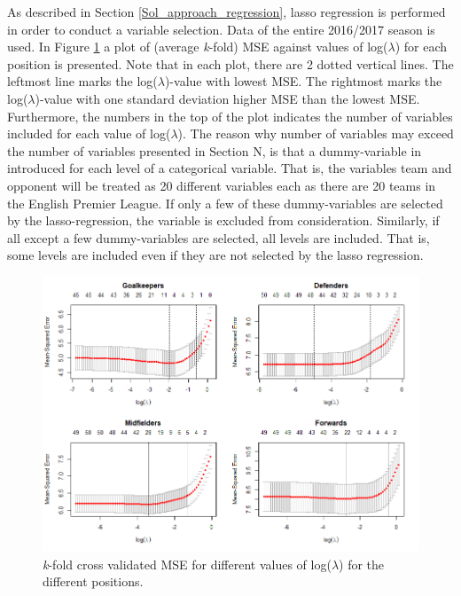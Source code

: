 As described in Section \ref{Sol_approach_regression}, lasso regression is performed in order to conduct a variable selection. Data of the entire 2016/2017 season is used. In Figure \ref{fig:lasso_all} a plot of (average \textit{k}-fold) MSE against values of log($\lambda$) for each position is presented. Note that in each plot, there are 2 dotted vertical lines. The leftmost line marks the log($\lambda$)-value with lowest MSE. The rightmost marks the log($\lambda$)-value with one standard deviation higher MSE than the lowest MSE. Furthermore, the numbers in the top of the plot indicates the number of variables included for each value of log($\lambda$). The reason why number of variables may exceed the number of variables presented in Section N, is that a dummy-variable in introduced for each level of a categorical variable. That is, the variables team and opponent will be treated as 20 different variables each as there are 20 teams in the English Premier League. If only a few of these dummy-variables are selected by the lasso-regression, the variable is excluded from consideration. Similarly, if all except a few dummy-variables are selected, all levels are included. That is, some levels are included even if they are not selected by the lasso regression.

\newpar

\begin{figure}[H]
    \centering
    \includegraphics[scale=0.55]{fig/chapter_6/lasso_all.png}
    \caption{\textit{k}-fold cross validated MSE for different values of log($\lambda$) for the different positions.}
\label{fig:lasso_all}    
\end{figure}

